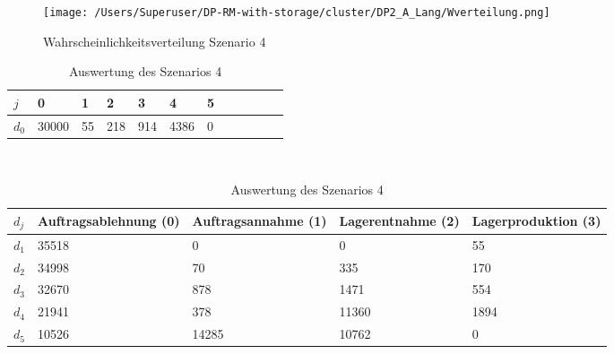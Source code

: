 \begin{figure}[h!]
  \begin{center}
    \texttt{[image: /Users/Superuser/DP-RM-with-storage/cluster/DP2\_A\_Lang/Wverteilung.png]}
    \caption{Wahrscheinlichkeitsverteilung Szenario 4}  \label{SB4}
  \end{center}
\end{figure}

\begin{table}[h!]
\renewcommand{\arraystretch}{1.5}
  \begin{center}
    \caption{Auswertung des Szenarios 4}  \label{AS4}
    \vspace*{3mm}
    \begin{tabular}{l l l l l l l l l l l l }  \hline 
         $j$ & 0 & 1  & 2 & 3 & 4  & 5   \\  \hline
$d_{0}$ &  30000 &  55 &  218 &  914 &  4386 &  0 \\
\hline
    \end{tabular} \\[3mm]
        \begin{tabular}{ l p{2.5cm} p{2.5cm} p{2.5cm} p{2.5cm} }   \hline    %
    $d_j$ & Auftrags\-ablehnung (0) & Auftrags\-annahme (1)  & Lager\-entnahme (2) & Lager\-produktion (3)\\\hline 
$d_1$ &  35518 &    0 &    0 &    55 \\
$d_2$ &  34998 &     70 &    335 &   170 \\
$d_3$ &  32670 &    878 &   1471 &   554 \\
$d_4$ &  21941 &    378 &  11360 &  1894 \\
$d_5$ &  10526 &  14285 &  10762 &   0 \\
          \hline
   \end{tabular} \\[3mm]
     \end{center}
\end{table}


